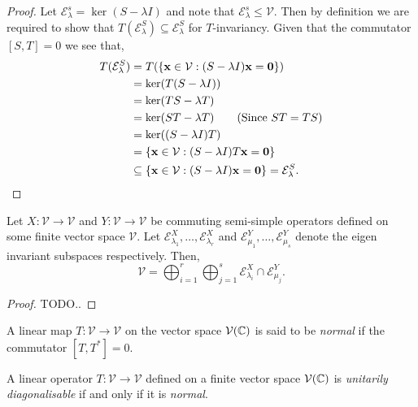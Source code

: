 \begin{proof}
 Let $\mathcal{E}_{\lambda}^{s} = \ker(S - \lambda I)$ and note that
 $\mathcal{E}_{\lambda}^{s} \leq \mathcal{V}$. Then by definition we
 are required to show that
 $T(\mathcal{E}_{\lambda}^{S}) \subseteq \mathcal{E}_{\lambda}^{S}$
 for $T$-invariancy. Given that the commutator $[S,T]=0$ we see that,
 \begin{align*}
  T(\mathcal{E}_{\lambda}^{S})
  &= T(\{ \mathbf{x} \in \mathcal{V} : (S - \lambda I) \mathbf{x} = \mathbf{0} \})
  \\
  &= \ker(T(S - \lambda I))
  \\
  &= \ker(TS - \lambda T)
  \\
  &= \ker(ST - \lambda T) \tag{Since $ST=TS$}
  \\
  &= \ker((S - \lambda I)T)
  \\
  &= \{ \mathbf{x} \in \mathcal{V} : (S - \lambda I) T \mathbf{x} = \mathbf{0} \}
  \\
  & \subseteq \{ \mathbf{x} \in \mathcal{V} : (S - \lambda I) \mathbf{x} = \mathbf{0} \}
  = \mathcal{E}_{\lambda}^{S}. \qedhere
 \end{align*}
\end{proof}

\begin{thm}
 Let $X: \mathcal{V} \to \mathcal{V}$ and $Y: \mathcal{V} \to \mathcal{V}$
 be commuting semi-simple operators defined on some finite vector space
 $\mathcal{V}$. Let $\mathcal{E}_{\lambda_1}^{X}, \dots, \mathcal{E}_{\lambda_r}^{X}$
 and $\mathcal{E}_{\mu_1}^{Y}, \dots, \mathcal{E}_{\mu_s}^{Y}$ denote the eigen
 invariant subspaces respectively. Then,
 \[
  \mathcal{V} = \bigoplus_{i=1}^{r} \bigoplus_{j=1}^{s}
  \mathcal{E}_{\lambda_i}^{X} \cap \mathcal{E}_{\mu_j}^{Y}.
 \]
\end{thm}

\begin{proof}
 TODO..
\end{proof}

\begin{defn}
 A linear map $T : \mathcal{V} \to \mathcal{V}$ on the vector space $\mathcal{V}(\mathbb{C})$
 is said to be \emph{normal} if the commutator $[T, T^{*}]=0$.
\end{defn}

\begin{thm}
 A linear operator $T : \mathcal{V} \to \mathcal{V}$ defined on a finite vector space
 $\mathcal{V}(\mathbb{C})$ is \emph{unitarily diagonalisable} if and only if it is \emph{normal}.
\end{thm}

